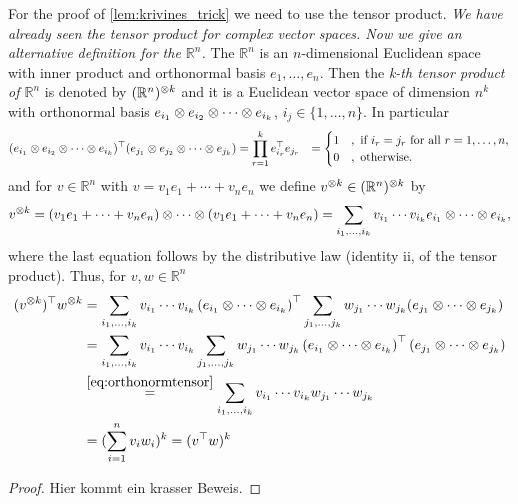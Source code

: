 For the proof of \ref{lem:krivines_trick} we need to use the tensor product. \textit{We have already seen the tensor product for complex vector spaces. Now we give an alternative definition for the $\mathbb{R}^n$.} The $\mathbb{R}^n$ is an $n$-dimensional Euclidean space with inner product \sclr{\cdot}{\cdot} and orthonormal basis $e_1,\dots,e_n$.
Then the \emph{k-th tensor product of $\mathbb{R}^n$} is denoted by $(\mathbb{R}^n)^{\otimes k}$ and it is a Euclidean  vector space of dimension $n^k$ with orthonormal basis $e_{i_1}\otimes e_{i_2} \otimes \cdots \otimes e_{i_k}$, $i_j\in\{1,\dots,n\}$. In particular
\begin{align}
	(e_{i_1}\otimes e_{i_2} \otimes \cdots \otimes e_{i_k})^\top (e_{j_1}\otimes e_{j_2} \otimes \cdots \otimes e_{j_k}) 
	&= \prod_{r=1}^k e_{i_r}^\top e_{j_r}
	&=\begin{cases}
		1 & , \text{ if } i_r=j_r \text{ for all } r=1,\dots,n,\\
		0 & , \text{ otherwise}.
	\end{cases} \label{eq:orthonormtensor}
\end{align}
and for $v\in\mathbb{R}^n$ with $v=v_1e_1+\cdots +v_ne_n$ we define $v^{\otimes k} \in (\mathbb{R}^n)^{\otimes k}$ by 
\begin{equation}
	v^{\otimes k} = (v_1e_1 + \cdots + v_ne_n) \otimes \cdots \otimes (v_1e_1 + \cdots + v_ne_n) = \sum_{i_1,\dots,i_k} v_{i_1}\cdots v_{i_k} e_{i_1}\otimes\cdots\otimes e_{i_k},
\end{equation}
where the last equation follows by the distributive law (identity ii, of the tensor product). 
Thus, for $v,w\in\mathbb{R}^n$ 
\begin{align}
	(v^{\otimes k})^\top w^{\otimes k}
	&= \sum_{i_1,\dots,i_k} v_{i_1}\cdots v_{i_k}\left(e_{i_1}\otimes\cdots\otimes e_{i_k}\right)^\top \sum_{j_1,\dots,j_k} w_{j_1}\cdots w_{j_k}(e_{j_1}\otimes\cdots\otimes e_{j_k}) \\
	&= \sum_{i_1,\dots,i_k} v_{i_1}\cdots v_{i_k} \sum_{j_1,\dots,j_k} w_{j_1}\cdots w_{j_k} \left(e_{i_1}\otimes\cdots\otimes e_{i_k}\right)^\top (e_{j_1}\otimes\cdots\otimes e_{j_k}) \\
	&\overset{\eqref{eq:orthonormtensor}}{=} \sum_{i_1,\dots,i_k} v_{i_1}\cdots v_{i_k}w_{j_1}\cdots w_{j_k} \\
	&=(\sum_{i=1}^n v_iw_i)^k = (v^\top w)^k
\end{align}
\begin{proof}
	Hier kommt ein krasser Beweis.
\end{proof}
